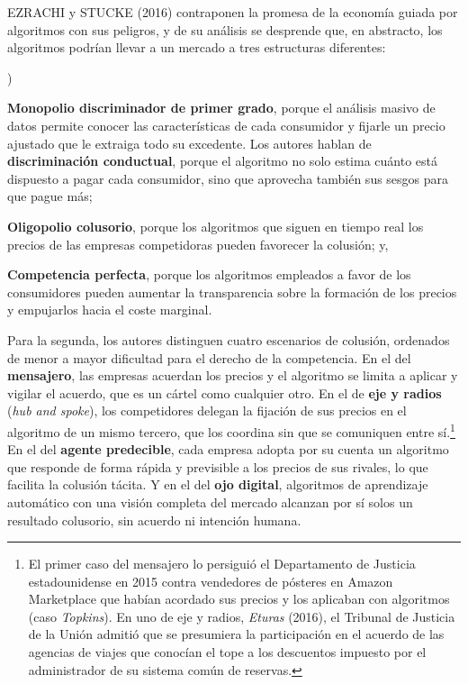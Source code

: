 \documentclass[10pt,a4paper]{article}
\newcounter{alphaitem}
\newenvironment{la}
      {\begin{list}{\alph{alphaitem})}{%
          \usecounter{alphaitem}%
          \setlength{\leftmargin}{1cm}%
          \setlength{\parskip}{3pt}%
          \setlength{\itemsep}{0pt}%
          \setlength{\parsep}{0pt}%
      }}
      {\end{list}}
\begin{document}
EZRACHI y STUCKE (2016) contraponen la promesa de la economía guiada por algoritmos con sus peligros, y de su análisis se desprende que, en abstracto, los algoritmos podrían llevar a un mercado a tres estructuras diferentes:
\begin{la}
    \item \textbf{Monopolio discriminador de primer grado}, porque el análisis masivo de datos permite conocer las características de cada consumidor y fijarle un precio ajustado que le extraiga todo su excedente. Los autores hablan de \textbf{discriminación conductual}, porque el algoritmo no solo estima cuánto está dispuesto a pagar cada consumidor, sino que aprovecha también sus sesgos para que pague más;
    \item \textbf{Oligopolio colusorio}, porque los algoritmos que siguen en tiempo real los precios de las empresas competidoras pueden favorecer la colusión; y,
    \item \textbf{Competencia perfecta}, porque los algoritmos empleados a favor de los consumidores pueden aumentar la transparencia sobre la formación de los precios y empujarlos hacia el coste marginal.
\end{la}

Para la segunda, los autores distinguen cuatro escenarios de colusión, ordenados de menor a mayor dificultad para el derecho de la competencia. En el del \textbf{mensajero}, las empresas acuerdan los precios y el algoritmo se limita a aplicar y vigilar el acuerdo, que es un cártel como cualquier otro. En el de \textbf{eje y radios} (\textit{hub and spoke}), los competidores delegan la fijación de sus precios en el algoritmo de un mismo tercero, que los coordina sin que se comuniquen entre sí.\footnote{%
    El primer caso del mensajero lo persiguió el Departamento de Justicia estadounidense en 2015 contra vendedores de pósteres en Amazon Marketplace que habían acordado sus precios y los aplicaban con algoritmos (caso \textit{Topkins}). En uno de eje y radios, \textit{Eturas} (2016), el Tribunal de Justicia de la Unión admitió que se presumiera la participación en el acuerdo de las agencias de viajes que conocían el tope a los descuentos impuesto por el administrador de su sistema común de reservas.
} En el del \textbf{agente predecible}, cada empresa adopta por su cuenta un algoritmo que responde de forma rápida y previsible a los precios de sus rivales, lo que facilita la colusión tácita. Y en el del \textbf{ojo digital}, algoritmos de aprendizaje automático con una visión completa del mercado alcanzan por sí solos un resultado colusorio, sin acuerdo ni intención humana.
\end{document}
